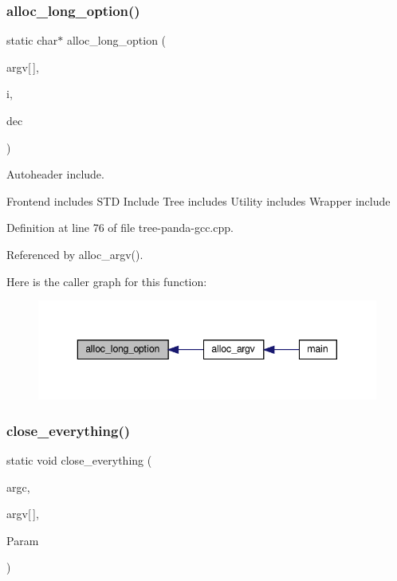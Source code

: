 \subsubsection{\texorpdfstring{alloc\+\_\+long\+\_\+option()}{alloc\_long\_option()}}
{\footnotesize\ttfamily static char$\ast$ alloc\+\_\+long\+\_\+option (\begin{DoxyParamCaption}\item[{char $\ast$}]{argv\mbox{[}$\,$\mbox{]},  }\item[{int \&}]{i,  }\item[{int \&}]{dec }\end{DoxyParamCaption})\hspace{0.3cm}{\ttfamily [static]}}



Autoheader include. 

Frontend includes S\+TD Include Tree includes Utility includes Wrapper include 

Definition at line 76 of file tree-\/panda-\/gcc.\+cpp.



Referenced by alloc\+\_\+argv().

Here is the caller graph for this function\+:
\nopagebreak
\begin{figure}[H]
\begin{center}
\leavevmode
\includegraphics[width=343pt]{d5/d39/tree-panda-gcc_8cpp_a21e223ecfa9ab60866ce6eebfcf51564_icgraph}
\end{center}
\end{figure}
\mbox{\label{tree-panda-gcc_8cpp_ae51885fe7e2d00d8ea88daa7c40f01e1}} 
\subsubsection{\texorpdfstring{close\+\_\+everything()}{close\_everything()}}
{\footnotesize\ttfamily static void close\+\_\+everything (\begin{DoxyParamCaption}\item[{int}]{argc,  }\item[{char $\ast$}]{argv\mbox{[}$\,$\mbox{]},  }\item[{const \hyperlink{Parameter_8hpp_a379beb25e5350c4c5585247ed50be3f9}{Parameter\+Ref} \&}]{Param }\end{DoxyParamCaption})\hspace{0.3cm}{\ttfamily [static]}}



